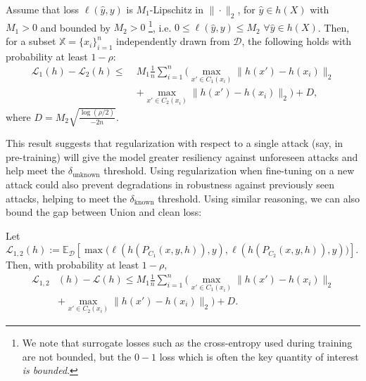 

\begin{theorem}
    \label{thm:robustness}
    Assume that loss $\ell(\hat{y},y)$ is $M_1$-Lipschitz in $\|\cdot\|_2$, for $\hat{y} \in h(X)$ with $M_1 > 0$ and bounded by $M_2 > 0$ \footnote{We note that surrogate losses such as the cross-entropy used during training are not bounded, but the $0-1$ loss which is often the key quantity of interest \emph{is bounded}.}, i.e. $0 \leq \ell(\hat{y},y) \leq M_2$ $\forall \hat{y} \in h(X)$. Then, for a subset $\mathbb{X} = \{x_i\}_{i=1}^n$ independently drawn from $\mathcal{D}$, the following holds with probability at least $1-\rho$:
    \begin{align*}
        \mathcal{L}_1(h) - \mathcal{L}_2(h) \leq \;&M_1 \frac{1}{n}\sum_{i=1}^n\biggl(\max_{x' \in C_1(x_i)}\|h(x') - h(x_i)\|_2 \\
        &+ \max_{x' \in C_2(x_i)}\|h(x') - h(x_i)\|_2\biggl) + D,
    \end{align*}
    where $D = M_2\sqrt{\frac{\log(\rho/2)}{-2n}}$. 
\end{theorem}
This result suggests that regularization with respect to a single attack (say, in pre-training) will give the model greater resiliency against unforeseen attacks and help meet the $\delta_\text{unknown}$ threshold. Using regularization when fine-tuning on a new attack could also prevent degradations in robustness against previously seen attacks, helping to meet the $\delta_\text{known}$ threshold.
Using similar reasoning, we can also bound the gap between Union and clean loss:
\begin{corollary}
\label{thm:corollary}
Let $\mathcal{L}_{1,2}(h) := \mathbb{E}_{\mathcal{D}}\left[\max{(\ell(h(P_{C_1}(x,y,h)),y),\ell(h(P_{C_2}(x,y,h)),y)})\right]$. Then, with probability at least $1 - \rho$,
\begin{align*}
        \mathcal{L}_{1,2}&(h) - \mathcal{L}(h) 
        \leq M_1 \frac{1}{n}\sum_{i=1}^n\biggl(\max_{x' \in C_1(x_i)}\|h(x') - h(x_i)\|_2 \\
        &+ \max_{x' \in C_2(x_i)}\|h(x') - h(x_i)\|_2\biggl) + D.
    \end{align*}
\end{corollary}
